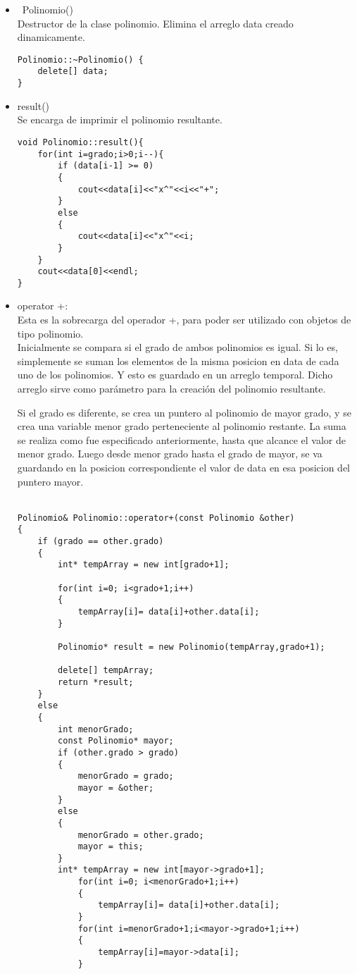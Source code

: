 \documentclass[11pt]{article}
\begin{document}
\begin{enumerate}
\begin{itemize}
\item ~Polinomio()\\
Destructor de la clase polinomio. Elimina el arreglo data creado dinamicamente.
\begin{lstlisting}
Polinomio::~Polinomio() {
    delete[] data;
}
\end{lstlisting}

\item result()\\
Se encarga de imprimir el polinomio resultante.\\
\begin{lstlisting}
void Polinomio::result(){
    for(int i=grado;i>0;i--){
        if (data[i-1] >= 0) 
        {
            cout<<data[i]<<"x^"<<i<<"+";
        }
        else 
        {
            cout<<data[i]<<"x^"<<i;
        }
    }
    cout<<data[0]<<endl;
}
\end{lstlisting}

\item operator +:\\
Esta es la sobrecarga del operador +, para poder ser utilizado con objetos de tipo polinomio.\\
Inicialmente se compara si el grado de ambos polinomios es igual. Si lo es, simplemente se suman los elementos de la misma posicion en data de cada uno de los polinomios. Y esto es guardado en un arreglo temporal. Dicho arreglo sirve como par\'ametro para la creaci\'on del polinomio resultante.

Si el grado es diferente, se crea un puntero al polinomio de mayor grado, y se crea una variable menor grado perteneciente al polinomio restante. La suma se realiza como fue especificado anteriormente, hasta que alcance el valor de menor grado. Luego desde menor grado hasta el grado de mayor, se va guardando en la posicion correspondiente el valor de data en esa posicion del puntero mayor.\\
\\
\begin{lstlisting}
Polinomio& Polinomio::operator+(const Polinomio &other)
{
    if (grado == other.grado)
    {
        int* tempArray = new int[grado+1];
        
        for(int i=0; i<grado+1;i++)
        {
            tempArray[i]= data[i]+other.data[i];
        }
        
        Polinomio* result = new Polinomio(tempArray,grado+1);
        
        delete[] tempArray;
        return *result;
    }
    else
    {
        int menorGrado;
        const Polinomio* mayor;
        if (other.grado > grado)
        {
            menorGrado = grado;
            mayor = &other;
        }
        else
        {
            menorGrado = other.grado;
            mayor = this;
        }
        int* tempArray = new int[mayor->grado+1];
            for(int i=0; i<menorGrado+1;i++)
            {
                tempArray[i]= data[i]+other.data[i];
            }
            for(int i=menorGrado+1;i<mayor->grado+1;i++)
            {
                tempArray[i]=mayor->data[i]; 
            }
          

\end{lstlisting}
\end{itemize}
\end{enumerate}
\end{document}
